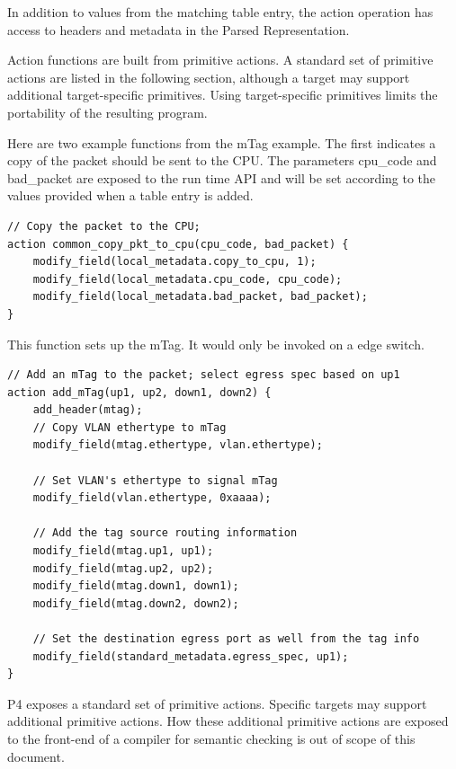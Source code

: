 \documentclass[12pt]{article}
\begin{document}
In addition to values from the matching table entry, the action operation 
has access to headers and metadata in the Parsed Representation.

Action functions are built from primitive actions. A standard set of
primitive actions are listed in the following section, although a
target may support additional target-specific primitives. Using
target-specific primitives limits the portability of the resulting
program.

Here are two example functions from the mTag example.  The first indicates 
a copy of the packet should be sent to the CPU.  The parameters cpu_code 
and bad_packet are exposed to the run time API and will be set according 
to the values provided when a table entry is added.

\begin{lstlisting}[keywords={},frame=single,escapechar=\@]
// Copy the packet to the CPU;
action common_copy_pkt_to_cpu(cpu_code, bad_packet) {
    modify_field(local_metadata.copy_to_cpu, 1);
    modify_field(local_metadata.cpu_code, cpu_code);
    modify_field(local_metadata.bad_packet, bad_packet);
}
\end{lstlisting}


This function sets up the mTag. It would only be invoked on a edge switch.

\begin{lstlisting}[keywords={},frame=single,escapechar=\@]
// Add an mTag to the packet; select egress spec based on up1
action add_mTag(up1, up2, down1, down2) {
    add_header(mtag);
    // Copy VLAN ethertype to mTag
    modify_field(mtag.ethertype, vlan.ethertype);

    // Set VLAN's ethertype to signal mTag
    modify_field(vlan.ethertype, 0xaaaa);

    // Add the tag source routing information
    modify_field(mtag.up1, up1);
    modify_field(mtag.up2, up2);
    modify_field(mtag.down1, down1);
    modify_field(mtag.down2, down2);

    // Set the destination egress port as well from the tag info
    modify_field(standard_metadata.egress_spec, up1);
}
\end{lstlisting}



P4 exposes a standard set of primitive actions. Specific targets may support
additional primitive actions. How these additional primitive actions are exposed
to the front-end of a compiler for semantic checking is out of scope of this
document.
\end{document}
